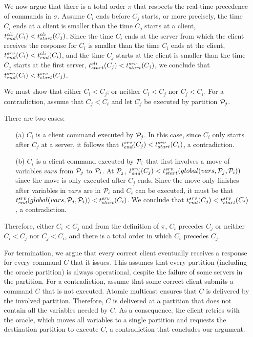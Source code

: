 %
We now argue that there is a total order $\pi$ that respects the real-time precedence of commands in $\sigma$.
Assume $C_i$ ends before $C_j$ starts, or more precisely, the time $C_i$ ends at a client is smaller than the time $C_j$ starts at a client, $t^{cli}_{end}(C_i) < t^{cli}_{start}(C_j)$.
Since the time $C_i$ ends at the server from which the client receives the response for $C_i$ is smaller than the time $C_i$ ends at the client, $t^{srv}_{end}(C_i) < t^{cli}_{end}(C_i)$, and the time $C_j$ starts at the client is smaller than the time $C_j$ starts at the first server, $t^{cli}_{start}(C_j) < t^{srv}_{start}(C_j)$, we conclude that $t^{srv}_{end}(C_i) < t^{srv}_{start}(C_j)$.

We must show that either $C_i < C_j$; or neither $C_i < C_j$ nor $C_j < C_i$.
For a contradiction, assume that $C_j <  C_i$ and let $C_j$ be executed by partition $\mathcal{P}_j$.

There are two cases: 
\begin{enumerate}
\item[(a)] $C_i$ is a client command executed by $\mathcal{P}_j$.
In this case, since $C_i$ only starts after $C_j$ at a server, it follows that $t^{srv}_{end}(C_j) < t^{srv}_{start}(C_i)$, a contradiction.
\item[(b)] $C_i$ is a client command executed by $\mathcal{P}_i$ that first involves a move of variables $vars$ from $\mathcal{P}_j$ to $\mathcal{P}_i$.
At $\mathcal{P}_j$, $t^{srv}_{end}(C_j) < t^{srv}_{start}(global(vars,\mathcal{P}_j,\mathcal{P}_i))$ since the move is only executed after $C_j$ ends.
Since the move only finishes after variables in $vars$ are in $\mathcal{P}_i$ and $C_i$ can be executed, it must be that
$t^{srv}_{end}(global(vars,\mathcal{P}_j,\mathcal{P}_i)) < t^{srv}_{start}(C_i)$.
We conclude that $t^{srv}_{end}(C_j) < t^{srv}_{start}(C_i)$, a contradiction.
\end{enumerate}
Therefore, either $C_i < C_j$ and from the definition of $\pi$, $C_i$ precedes $C_j$ or neither $C_i < C_j$ nor $C_j < C_i$, and there is a total order in which $C_i$ precedes $C_j$.

For termination, we argue that every correct client eventually receives a response for every command $C$ that it issues.
This assumes that every partition (including the oracle partition) is always operational, despite the failure of some servers in the partition.
For a contradiction, assume that some correct client submits a command $C$ that is not executed.
Atomic multicast ensures that $C$ is delivered by the involved partition.
Therefore, $C$ is delivered at a partition that does not contain all the variables needed by $C$.
As a consequence, the client retries with the oracle, which moves all variables to a single partition and requests the destination partition to execute $C$, a contradiction that concludes our argument.


